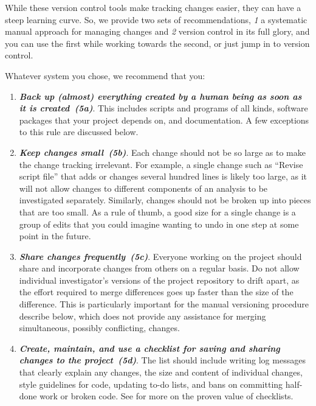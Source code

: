 \documentclass[10pt,letterpaper]{article}
\newcommand{\practice}[2]{\textbf{\emph{{#2}~({#1})}}}
\begin{document}
While these version control tools make tracking changes easier, they
can have a steep learning curve. So, we provide two sets of
recommendations, \emph{1} a systematic manual approach for managing
changes and \emph{2} version control in its full glory, and you can
use the first while working towards the second, or just jump in to
version control.

Whatever system you chose, we recommend that you:

\begin{enumerate}

\item

  \practice{5a}{Back up (almost) everything created by a human being
  as soon as it is created}. This includes scripts and programs of
  all kinds, software packages that your project depends on, and
  documentation. A few exceptions to this rule are discussed below.

\item

  \practice{5b}{Keep changes small}. Each change should not be so
  large as to make the change tracking irrelevant. For example, a
  single change such as ``Revise script file'' that adds or changes
  several hundred lines is likely too large, as it will not allow
  changes to different components of an analysis to be investigated
  separately. Similarly, changes should not be broken up into pieces
  that are too small. As a rule of thumb, a good size for a single
  change is a group of edits that you could imagine wanting to undo in
  one step at some point in the future.

\item

  \practice{5c}{Share changes frequently}. Everyone working on the
  project should share and incorporate changes from others on a
  regular basis. Do not allow individual investigator's versions of
  the project repository to drift apart, as the effort required to
  merge differences goes up faster than the size of the
  difference. This is particularly important for the manual versioning
  procedure describe below, which does not provide any assistance for
  merging simultaneous, possibly conflicting, changes.

\item

  \practice{5d}{Create, maintain, and use a checklist for saving and
  sharing changes to the project}. The list should include writing
  log messages that clearly explain any changes, the size and content
  of individual changes, style guidelines for code, updating to-do
  lists, and bans on committing half-done work or broken code.  See
  \cite{gawande2011} for more on the proven value of checklists.


\end{enumerate}
\end{document}
